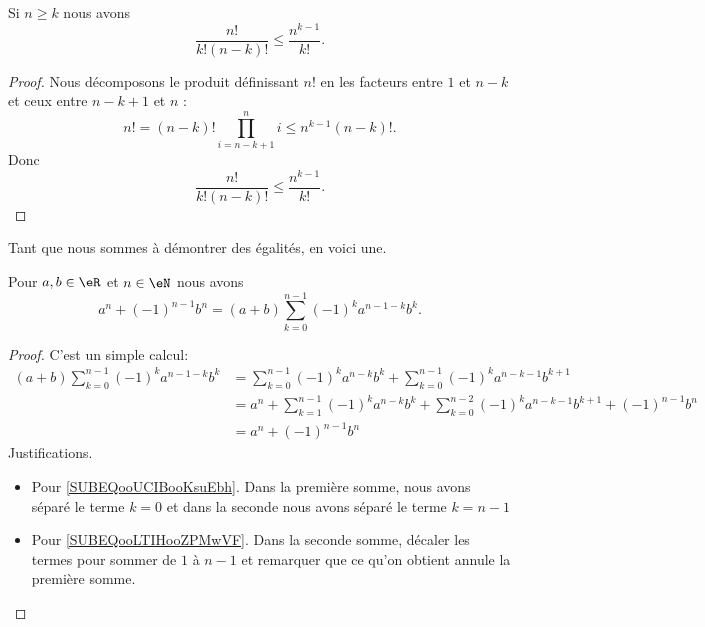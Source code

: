 \begin{lemma}        \label{LEMooLPCXooYIzJsD}
	Si \( n\geq k\) nous avons
	\begin{equation}
		\frac{ n! }{ k!(n-k)! }\leq \frac{ n^{k-1} }{ k! }.
	\end{equation}
\end{lemma}

\begin{proof}
	Nous décomposons le produit définissant \( n!\) en les facteurs entre \( 1\) et \( n-k\) et ceux entre \( n-k+1\) et \( n\) :
	\begin{equation}
		n!=(n-k)!\prod_{i=n-k+1}^ni\leq n^{k-1}(n-k)!.
	\end{equation}
	Donc
	\begin{equation}
		\frac{ n! }{ k!(n-k)! }\leq \frac{ n^{k-1} }{ k! }.
	\end{equation}
\end{proof}

Tant que nous sommes à démontrer des égalités, en voici une.

\begin{lemma}     \label{LEMooLPOQooICJYdV}
	Pour \( a,b\in \eR\) et \( n\in \eN\) nous avons
	\begin{equation}
		a^n+(-1)^{n-1}b^n=(a+b)\sum_{k=0}^{n-1}(-1)^ka^{n-1-k}b^k.
	\end{equation}
\end{lemma}

\begin{proof}
	C'est un simple calcul:
	\begin{subequations}
		\begin{align}
			(a+b)\sum_{k=0}^{n-1}(-1)^ka^{n-1-k}b^k & =  \sum_{k=0}^{n-1}(-1)^ka^{n-k}b^k+\sum_{k=0}^{n-1}(-1)^ka^{n-k-1}b^{k+1}                                                 \\
			                                        & = a^n+\sum_{k=1}^{n-1}(-1)^ka^{n-k}b^k+\sum_{k=0}^{n-2}(-1)^ka^{n-k-1}b^{k+1} +(-1)^{n-1}b^n   \label{SUBEQooUCIBooKsuEbh} \\
			                                        & = a^n+(-1)^{n-1}b^n                                            \label{SUBEQooLTIHooZPMwVF}
		\end{align}
	\end{subequations}
	Justifications.
	\begin{itemize}
		\item Pour \eqref{SUBEQooUCIBooKsuEbh}. Dans la première somme, nous avons séparé le terme \( k=0\) et dans la seconde nous avons séparé le terme \( k=n-1\)
		\item Pour \eqref{SUBEQooLTIHooZPMwVF}. Dans la seconde somme, décaler les termes pour sommer de \( 1\) à \( n-1\) et remarquer que ce qu'on obtient annule la première somme.
	\end{itemize}
\end{proof}

